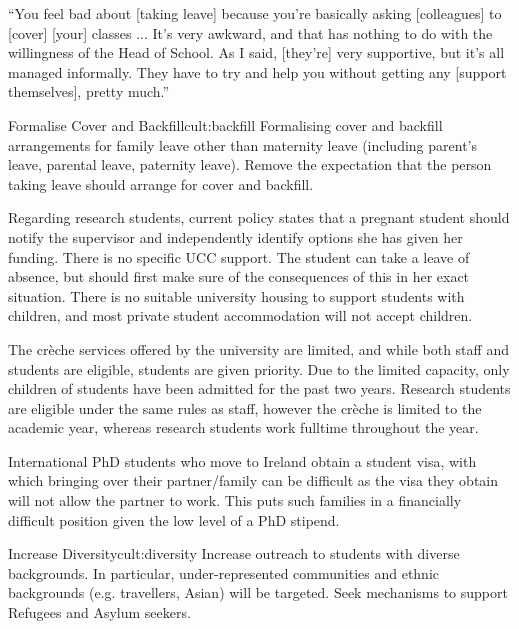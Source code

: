 \begin{myquote}
“You feel bad about [taking leave] because you're basically asking [colleagues] to [cover] [your] classes ... It's very awkward, and that has nothing to do with the willingness of the Head of School. As I said, [they’re] very supportive, but it's all managed informally. They have to try and help you without getting any [support themselves], pretty much.”  
\end{myquote}

\newcommand{\actcultbackfill}{Formalising cover and backfill arrangements for family leave other than maternity leave (including parent’s leave, parental leave, paternity leave). Remove the expectation that the person taking leave should arrange for cover and backfill.}
\begin{actionblock}{\ksspace{}Formalise Cover and Backfill}{cult:backfill}
\actcultbackfill
\hfill{
    \hypersetup{hidelinks}
    \hyperlink{e4}{\gotoactionsymbol{}}
}
\end{actionblock}



Regarding research students, current policy states that a pregnant student should notify the supervisor and independently identify options she has given her funding. There is no specific UCC support. %
The student can take a leave of absence, but should first make sure of the consequences of this in her exact situation. There is no suitable university housing to support students with children, and most private student accommodation will not accept children.  

The cr\`{e}che services offered by the university are limited, and while both staff and students are eligible, students are given priority. Due to the limited capacity,  only children of students have been admitted for the past two years. Research students are eligible under the same rules as staff, however the cr\`{e}che is limited to the academic year, whereas research students work fulltime throughout the year.

International PhD students who move to Ireland obtain a student visa, with which bringing over their partner/family can be difficult as the visa they obtain will not allow the partner to work. This puts such families in a financially difficult position given the low level of a PhD stipend. 





\newcommand{\actcultdiversity}{Increase outreach to students with diverse backgrounds. In particular, under-represented communities and ethnic backgrounds (e.g. travellers, Asian) will be targeted. Seek mechanisms to support Refugees and Asylum seekers.}
\begin{actionblock}{\ksspace{}Increase Diversity}{cult:diversity}
\actcultdiversity
\hfill{
    \hypersetup{hidelinks}
    \hyperlink{e1}{\gotoactionsymbol{}}
}
\end{actionblock}


